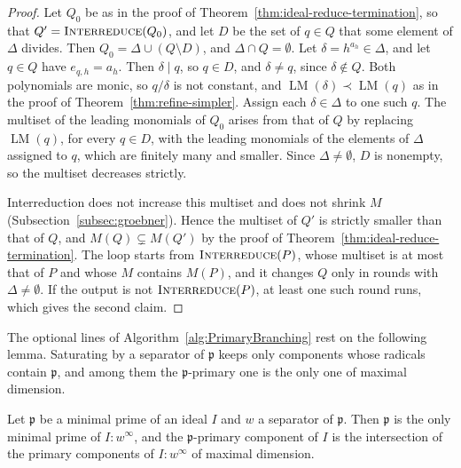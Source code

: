 \begin{proof}
  Let $Q_0$ be as in the proof of Theorem~\ref{thm:ideal-reduce-termination},
  so that $Q'=\Call{Interreduce}{Q_0}$, and let $D$ be the set of $q\in Q$ that
  some element of $\Delta$ divides. Then $Q_0=\Delta\cup(Q\setminus D)$, and
  $\Delta\cap Q=\emptyset$. Let $\delta=h^{a_h}\in\Delta$, and let $q\in Q$
  have $e_{q,h}=a_h$. Then $\delta\mid q$, so $q\in D$, and $\delta\neq q$,
  since $\delta\notin Q$. Both polynomials are monic, so $q/\delta$ is not
  constant, and $\operatorname{LM}(\delta)\prec\operatorname{LM}(q)$ as in the
  proof of Theorem~\ref{thm:refine-simpler}. Assign each $\delta\in\Delta$ to
  one such $q$. The multiset of the leading monomials of $Q_0$ arises from
  that of $Q$ by replacing $\operatorname{LM}(q)$, for every $q\in D$, with
  the leading monomials of the elements of $\Delta$ assigned to $q$, which are
  finitely many and smaller. Since $\Delta\neq\emptyset$, $D$ is nonempty, so
  the multiset decreases strictly.

  Interreduction does not increase this multiset and does not shrink $M$
  (Subsection~\ref{subsec:groebner}). Hence the multiset of $Q'$ is strictly
  smaller than that of $Q$, and $M(Q)\subsetneq M(Q')$ by the proof of
  Theorem~\ref{thm:ideal-reduce-termination}. The loop starts from
  $\Call{Interreduce}{P}$, whose multiset is at most that of $P$ and whose
  $M$ contains $M(P)$, and it changes $Q$ only in rounds with
  $\Delta\neq\emptyset$. If the output is not $\Call{Interreduce}{P}$, at
  least one such round runs, which gives the second claim.
\end{proof}

The optional lines of Algorithm~\ref{alg:PrimaryBranching} rest on the
following lemma. Saturating by a separator of $\mathfrak p$ keeps only
components whose radicals contain $\mathfrak p$, and among them the
$\mathfrak p$-primary one is the only one of maximal dimension.

\begin{lemma}
  \label{lem:isolated-separator}
  Let $\mathfrak p$ be a minimal prime of an ideal $I$ and $w$ a separator of
  $\mathfrak p$. Then $\mathfrak p$ is the only minimal prime of $I:w^\infty$,
  and the $\mathfrak p$-primary component of $I$ is the intersection of the
  primary components of $I:w^\infty$ of maximal dimension.
\end{lemma}

